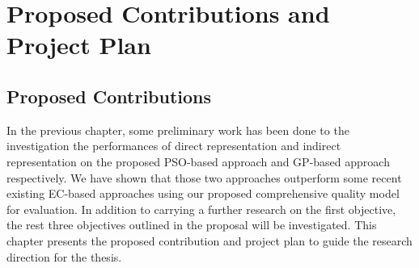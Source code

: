 \chapter{Proposed Contributions and Project Plan}\label{C:plan}

\section{Proposed Contributions}

In the previous chapter, some preliminary work has been done to the investigation the performances of direct representation and indirect representation on the proposed PSO-based approach and GP-based approach respectively. We have shown that those two approaches outperform some recent existing EC-based approaches using our proposed comprehensive quality model for evaluation. In addition to carrying a further research on the first objective, the rest three objectives outlined in the proposal will be investigated. This chapter presents the proposed contribution and project plan to guide the research direction for the thesis.

